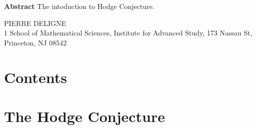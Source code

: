 \documentclass[12pt,twoside]{book}
\makeatletter
\renewcommand{\tableofcontents}{%
\section*{Contents}
\vspace*{-5pt}%
\@starttoc{toc}}
\theoremstyle{plain}
\theoremstyle{definition}
\theoremstyle{remark}
\numberwithin{equation}{section}
\makeatother
\begin{document}
\begin{titlepage}
\begin{flushleft}
\begin{varwidth}{\linewidth}
\textbf{Abstract}\hspace{0.2em}
The intoduction to Hodge Conjecture.
\end{varwidth}

\vspace{5em}
\vfill

\faEnvelope[regular]\hspace{0.2em} PIERRE DELIGNE\\
1\hspace{0.8em} School of Mathematical Sciences, Institute for Advanced Study, 173 Nassau St, Princeton, NJ 08542\\
\end{flushleft}
\end{titlepage}
\let\cleardoublepage\clearpage
\setcounter{tocdepth}{2}
\tableofcontents\let\cleardoublepage\clearpage
\thispagestyle{fancy}
\newpage
\renewcommand\thesection{\arabic {section}}
\section{\bf The Hodge Conjecture}
\end{document}
